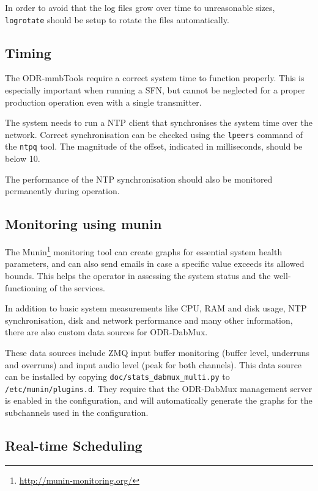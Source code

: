 
In order to avoid that the log files grow over time to unreasonable sizes,
\texttt{logrotate} should be setup to rotate the files automatically.


\subsection{Timing}
The ODR-mmbTools require a correct system time to function properly. This is
especially important when running a SFN, but cannot be neglected for a proper
production operation even with a single transmitter.

The system needs to run a NTP client that synchronises the system time over the
network. Correct synchronisation can be checked using the \texttt{lpeers}
command of the \texttt{ntpq} tool. The magnitude of the offset, indicated in
milliseconds, should be below 10.

The performance of the NTP synchronisation should also be monitored permanently
during operation.


\subsection{Monitoring using munin}

The Munin\footnote{\url{http://munin-monitoring.org/}} monitoring tool can
create graphs for essential system health parameters, and can also send emails
in case a specific value exceeds its allowed bounds. This helps the operator in
assessing the system status and the well-functioning of the services.

In addition to basic system measurements like CPU, RAM and disk usage, NTP
synchronisation, disk and network performance and many other information, there
are also custom data sources for ODR-DabMux.

These data sources include ZMQ input buffer monitoring (buffer level, underruns
and overruns) and input audio level (peak for both channels). This data source
can be installed by copying \verb+doc/stats_dabmux_multi.py+ to
\texttt{/etc/munin/plugins.d}. They require that the ODR-DabMux management
server is enabled in the configuration, and will automatically generate the
graphs for the subchannels used in the configuration.


\subsection{Real-time Scheduling}

